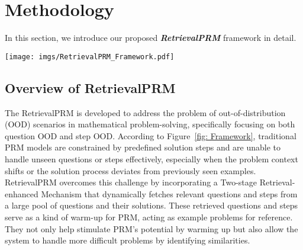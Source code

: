 \section{Methodology}

In this section, we introduce our proposed \textbf{\textit{RetrievalPRM}} framework in detail.


\begin{figure*}[t]
  \centering
  \vspace{-30pt}
  \texttt{[image: imgs/RetrievalPRM\_Framework.pdf]}
  \vspace{-20pt}
  \caption{The model structure of our proposed RetrievalPRM framework and its difference with traditional PRM. We design a Two-stage Retrieval Module to retrieve reference questions and steps in each stage. }
  \label{fig: Framework}
  \vspace{-10pt}
\end{figure*}


\subsection{Overview of RetrievalPRM}

The RetrievalPRM is developed to address the problem of out-of-distribution (OOD) scenarios in mathematical problem-solving, specifically focusing on both question OOD and step OOD. According to Figure~\ref{fig: Framework}, traditional PRM models are constrained by predefined solution steps and are unable to handle unseen questions or steps effectively, especially when the problem context shifts or the solution process deviates from previously seen examples. RetrievalPRM overcomes this challenge by incorporating a Two-stage Retrieval-enhanced Mechanism that dynamically fetches relevant questions and steps from a large pool of questions and their solutions. These retrieved questions and steps serve as a kind of warm-up for PRM, acting as example problems for reference. They not only help stimulate PRM's potential by warming up but also allow the system to handle more difficult problems by identifying similarities.


